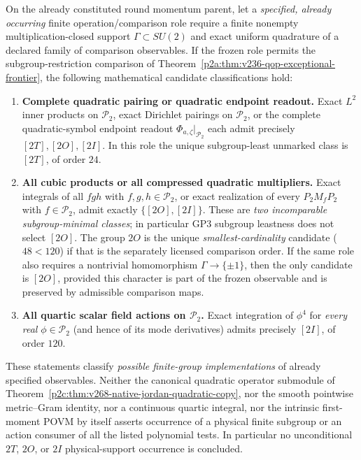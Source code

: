 \documentclass[12pt,a4paper]{article}
\begin{document}
\begin{theorem}
\label{p2a:thm:v268-observable-exceptional-frontier}
On the already constituted round momentum parent, let a \emph{specified,
already occurring} finite operation/comparison role require a finite
nonempty multiplication-closed support $\Gamma\subset SU(2)$ and exact
uniform quadrature of a declared family of comparison observables.
If the frozen role permits the subgroup-restriction comparison of
Theorem~\ref{p2a:thm:v236-qop-exceptional-frontier}, the following
mathematical candidate classifications hold:
\begin{enumerate}[label=(\roman*),leftmargin=2em]
\item \textbf{Complete quadratic pairing or quadratic endpoint readout.}
Exact $L^2$ inner products on $\mathcal P_2$, exact Dirichlet pairings
on $\mathcal P_2$, or the complete quadratic-symbol endpoint readout
$\Phi_{a,\zeta}|_{\mathcal P_2}$ each admit precisely
$[2T],[2O],[2I]$.  In this role the unique subgroup-least
unmarked class is $\boxed{[2T]}$, of order $24$.
\item \textbf{All cubic products or all compressed quadratic multipliers.}
Exact integrals of all $fgh$ with $f,g,h\in\mathcal P_2$, or
exact realization of every $P_2M_fP_2$ with $f\in\mathcal P_2$,
admit exactly $\boxed{\{[2O],[2I]\}}$.
These are \emph{two incomparable subgroup-minimal classes}; in
particular GP3 subgroup leastness does not select $[2O]$.
The group $2O$ is the unique \emph{smallest-cardinality} candidate
($48<120$) if that is the separately licensed comparison order.
If the same role also requires a nontrivial homomorphism
$\Gamma\to\{\pm1\}$, then the only candidate is $[2O]$, provided
this character is part of the frozen observable and is preserved by
admissible comparison maps.
\item \textbf{All quartic scalar field actions on $\mathcal P_2$.}
Exact integration of $\phi^4$ for \emph{every real}
$\phi\in\mathcal P_2$ (and hence of its mode derivatives) admits
precisely $\boxed{[2I]}$, of order $120$.
\end{enumerate}
These statements classify \emph{possible finite-group implementations}
of already specified observables.  Neither the canonical quadratic
operator submodule of
Theorem~\ref{p2c:thm:v268-native-jordan-quadratic-copy}, nor the
smooth pointwise metric--Gram identity, nor a continuous quartic
integral, nor the intrinsic first-moment POVM by itself asserts
occurrence of a physical finite subgroup or an action consumer of
all the listed polynomial tests.  In particular no unconditional
$2T$, $2O$, or $2I$ physical-support occurrence is concluded.
\end{theorem}
\end{document}
